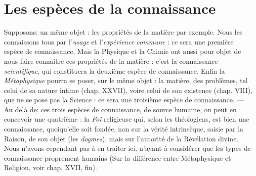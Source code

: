 \section{Les espèces de la connaissance}%
Supposons: un même
objet : les propriétés de la matière par exemple. Nous les connaissons
tous par l’{\it usage} et l'{\it expérience commune} : ce sera une première espèce
de connaissance. Mais la Physique et la Chimie ont aussi pour objet
de nous faire connaître ces propriétés de la matière : c’est la connaissance
{\it scientifique}, qui constituera la deuxième espèce de connaissance.
Enfin la {\it Métaphysique} pourra se poser, sur le même objet : la
matière, des problèmes, tel celui de sa nature intime (chap. XXVII),
voire celui de son existence (chap. VIII), que ne se pose pas la
Science : ce sera une troisième espèce de connaissance. — Au delà de:
ces trois espèces de connaissance, de source humaine, on peut en
concevoir une quatrième : la {\it Foi} religieuse qui, selon les théologiens,
est bien une connaissance, quoiqu’elle soit fondée, non sur la vérité
intrinsèque, saisie par la Raison, de son objet (les {\it dogmes}), mais sur
l’autorité de la Révélation divine. Nous n’avons cependant pas à en
traiter ici, n’ayant à considérer que les types de connaissance proprement
humains
{\scriptsize (Sur la différence entre Métaphysique et Religion, voir chap. XVII, fin)}.

